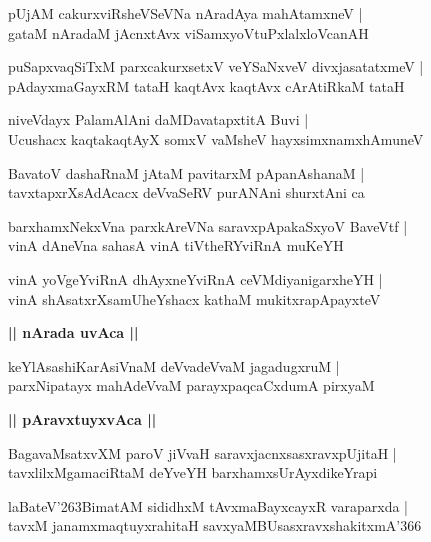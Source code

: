 \documentclass[twoside,12pt,openright]{book}
\def\S{\char'263}
\newcounter{shloka}[chapter]
\def\uvaca#1{\centerline{{\large\textbf{#1}}}}
\begin{document}
\begin{shloka}%
pUjAM cakurxviRsheVSeVNa nAradAya mahAtamxneV |\\
gataM nAradaM jAcnxtAvx viSamxyoVtuPxlalxloVcanAH 
\end{shloka}

\begin{shloka}%
puSapxvaqSiTxM parxcakurxsetxV veYSaNxveV divxjasatatxmeV |\\
pAdayxmaGayxRM tataH kaqtAvx kaqtAvx cArAtiRkaM tataH 
\end{shloka}

\begin{shloka}%
niveVdayx PalamAlAni daMDavatapxtitA Buvi |\\
Ucushacx kaqtakaqtAyX somxV vaMsheV hayxsimxnamxhAmuneV 
\end{shloka}

\begin{shloka}%
BavatoV dashaRnaM jAtaM pavitarxM pApanAshanaM |\\
tavxtapxrXsAdAcacx deVvaSeRV purANAni shurxtAni ca 
\end{shloka}

\begin{shloka}%
barxhamxNekxVna parxkAreVNa saravxpApakaSxyoV BaveVtf |\\
vinA dAneVna sahasA vinA tiVtheRYviRnA muKeYH
\end{shloka}

\begin{shloka}%
vinA yoVgeYviRnA dhAyxneYviRnA ceVMdiyanigarxheYH |\\
vinA shAsatxrXsamUheYshacx kathaM mukitxrapApayxteV 
\end{shloka}

\uvaca{|| nArada uvAca ||}

\begin{shloka}%
keYlAsashiKarAsiVnaM deVvadeVvaM jagadugxruM |\\
parxNipatayx mahAdeVvaM parayxpaqcaCxdumA pirxyaM
\end{shloka}

\uvaca{|| pAravxtuyxvAca ||}

\begin{shloka}%
BagavaMsatxvXM paroV jiVvaH saravxjacnxsasxravxpUjitaH |\\
tavxlilxMgamaciRtaM deYveYH barxhamxsUrAyxdikeYrapi
\end{shloka}

\begin{shloka}%
laBateV\S BimatAM sididhxM tAvxmaBayxcayxR varaparxda |\\
tavxM janamxmaqtuyxrahitaH savxyaMBUsasxravxshakitxmA\char'366
\end{shloka}
\end{document}
